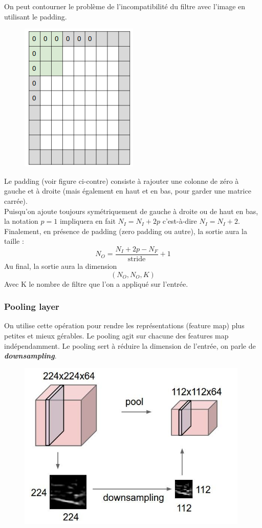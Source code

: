 \documentclass[a4paper,12pt]{report}
\newcommand\bk{\color{black}}
\newcommand\navy{\color{navy}}
\newcommand{\cad}{c'est-à-dire}
\numberwithin{equation}{section} %
\begin{document}
On peut contourner le problème de l'incompatibilité du filtre avec l'image en utilisant le padding.\\ 

\begin{figure} \vspace{-8mm}
\centering
\includegraphics[scale=0.4]{padd.png}
\end{figure}

Le padding (voir figure ci-contre) consiste à rajouter une colonne de zéro à gauche et à droite (mais également en haut et en bas, pour garder une matrice carrée).\\
Puisqu'on ajoute toujours symétriquement de gauche à droite ou de haut en bas, la notation $p = 1$ impliquera en fait $N_I =N_I + 2p$ \cad $ $ $N_I = N_I + 2$.\\
Finalement, en présence de padding (zero padding ou autre), la sortie aura la taille :\\ $$ N_O = \frac{N_I +2p - N_F}{\text{stride}} + 1$$
Au final, la sortie aura la dimension $$ (N_O, N_O, K)$$ Avec K le nombre de filtre que l'on a appliqué sur l'entrée.

\navy \subsubsection{Pooling layer} \bk
On utilise cette opération pour rendre les représentations (feature map) plus petites et mieux gérables. Le pooling agit sur chacune des features map indépendamment. Le pooling sert à réduire la dimension de l'entrée, on parle de \textit{\textbf{downsampling}}.

\begin{figure}[!ht]
\centering
\includegraphics[scale=0.5]{pooling_sketch.png}
\end{figure}
\end{document}
